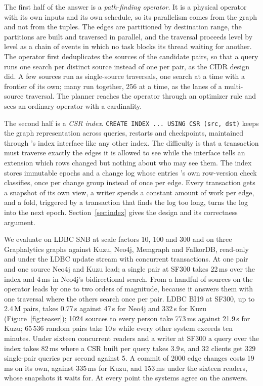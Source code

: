 The first half of the answer is a \emph{path-finding operator}. It is a physical operator with its own inputs and its
own schedule, so its parallelism comes from the graph and not from the tuples. The edges are partitioned by
destination range, the partitions are built and traversed in parallel, and the traversal proceeds level by level as a
chain of \duckdb events in which no task blocks its thread waiting for another. The operator first deduplicates the
sources of the candidate pairs, so that a query runs one search per distinct source instead of one per pair, as the
CIDR design did. A few sources run as single-source traversals, one search at a time with a frontier of its own; many
run together, 256 at a time, as the lanes of a multi-source traversal. The planner reaches the operator through an
optimizer rule and sees an ordinary operator with a cardinality.

The second half is a \emph{CSR index}. \texttt{CREATE INDEX ... USING CSR (src, dst)} keeps the graph representation
across queries, restarts and checkpoints, maintained through \duckdb's index interface like any other index. The difficulty is that a transaction must traverse exactly the edges it is allowed to see while the interface tells an extension which rows changed but nothing about who may see them. The index stores immutable epochs and a
change log whose entries \duckdb's own row-version check classifies, once per change group instead of once per edge.
Every transaction gets a snapshot of its own view, a writer spends a constant amount of work per edge, and a fold,
triggered by a transaction that finds the log too long, turns the log into the next epoch. Section~\ref{sec:index}
gives the design and its correctness argument.

We evaluate on LDBC SNB at scale factors 10, 100 and 300 and on three Graphalytics graphs against Kuzu, Neo4j,
Memgraph and FalkorDB, read-only and under the LDBC update stream with concurrent transactions. At one pair and one
source Neo4j and Kuzu lead; a single pair at SF300 takes 22\,ms over the index and 4\,ms in Neo4j's bidirectional
search. From a handful of sources on the operator leads by one to two orders of magnitude, because it answers them
with one traversal where the others search once per pair. LDBC BI19 at SF300, up to 2.4\,M pairs, takes 0.77\,s
against 47\,s for Neo4j and 332\,s for Kuzu (Figure~\ref{fig:teaser}); 1024 sources to every person take 773\,ms
against 21.9\,s for Kuzu; 65\,536 random pairs take 10\,s while every other system exceeds ten minutes. Under sixteen
concurrent readers and a writer at SF300 a query over the index takes 82\,ms where a CSR built per query takes
3.9\,s, and 32 clients get 329 single-pair queries per second against 5. A commit of 2000 edge changes costs 19\,ms on its own, against 335\,ms for Kuzu, and 153\,ms under the sixteen readers, whose snapshots it waits for. At every point the systems agree on the answers.

